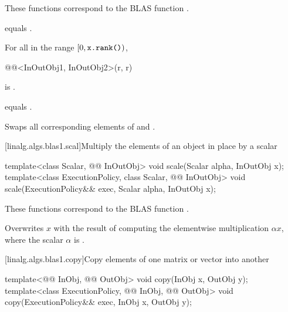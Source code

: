 \begin{itemdescr}
\pnum
\begin{note}
These functions correspond to the BLAS function \supercite{blas1}.
\end{note}

\pnum
\constraints
{} equals .

\pnum
\mandates
For all  in the range $[0, \texttt{\protect x.rank()})$,
\begin{codeblock}
@@<InOutObj1, InOutObj2>(r, r)
\end{codeblock}
is .

\pnum
\expects
{} equals .

\pnum
\effects
Swaps all corresponding elements of  and .
\end{itemdescr}

[linalg.algs.blas1.scal]{Multiply the elements of an object in place by a scalar}

%
\begin{itemdecl}
template<class Scalar, @@ InOutObj>
  void scale(Scalar alpha, InOutObj x);
template<class ExecutionPolicy, class Scalar, @@ InOutObj>
  void scale(ExecutionPolicy&& exec, Scalar alpha, InOutObj x);
\end{itemdecl}

\begin{itemdescr}
\pnum
\begin{note}
These functions correspond to the BLAS function \supercite{blas1}.
\end{note}

\pnum
\effects
Overwrites $x$ with the result of
computing the elementwise multiplication $\alpha x$,
where the scalar $\alpha$ is .
\end{itemdescr}

[linalg.algs.blas1.copy]{Copy elements of one matrix or vector into another}

%
\begin{itemdecl}
template<@@ InObj, @@ OutObj>
  void copy(InObj x, OutObj y);
template<class ExecutionPolicy, @@ InObj, @@ OutObj>
  void copy(ExecutionPolicy&& exec, InObj x, OutObj y);
\end{itemdecl}

